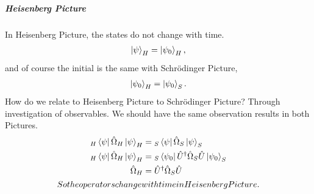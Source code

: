 \documentclass[letterpaper,10pt,english]{sphinxmanual}
\newcommand{\bra}[1]{\left\langle #1\right|}
\newcommand{\ket}[1]{\left| #1\right\rangle}
\begin{document}
\subparagraph{Heisenberg Picture}
\label{Quantum/QuantumMechanics:heisenberg-picture}
In Heisenberg Picture, the states do not change with time.
\begin{gather}
\begin{split}\ket{\psi} _ H = \ket{\psi_0} _ H ,\end{split}\notag
\end{gather}
and of course the initial is the same with Schrödinger Picture,
\begin{gather}
\begin{split}\ket{\psi_0} _ H = \ket{\psi _ 0} _ S .\end{split}\notag
\end{gather}
How do we relate to Heisenberg Picture to Schrödinger Picture? Through investigation of observables. We should have the same observation results in both Pictures.
\begin{gather}
\begin{split}{} _ H \bra{\psi} \hat \Omega _ H \ket{\psi} _ H & =  {} _ S \bra{\psi} \hat \Omega _ S \ket{\psi} _ S \\
  {} _ H \bra{\psi} \hat \Omega _ H \ket{\psi} _ H & =  {} _ S \bra{\psi _ 0} \hat U^\dagger \hat \Omega _ S  \hat U \ket{\psi _ 0} _ S \\
  \hat \Omega _ H & =  \hat U^\dagger \hat \Omega _ S \hat U\end{split}\notag\\\begin{split}So the operators change with time in Heisenberg Picture.\end{split}\notag
\end{gather}
\end{document}
